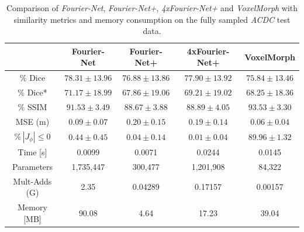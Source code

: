 \documentclass[english,version-2022-01]{uzl-thesis} %
\begin{document}
\begin{table}[h] %
	\centering
	\caption{Comparison of \emph{Fourier-Net}, \emph{Fourier-Net+}, \emph{4xFourier-Net+} and \emph{VoxelMorph} with similarity metrics and memory consumption on the fully sampled \emph{ACDC} test data.}
	\label{tab:CompareVoxelMorph}
	\begin{tabular}{c c c c c} %
		\toprule
		 & Fourier-Net & Fourier-Net+ & 4xFourier-Net+ & VoxelMorph \\		
		\midrule
		$\%$ Dice & $78.31 \pm 13.96$ & $76.88 \pm 13.86$ & $77.90 \pm 13.92$ & $75.84 \pm 13.46$ \\
		$\%$ Dice* & $71.17 \pm 18.99$ & $67.86 \pm 19.06$ & $69.21 \pm 19.02$ & $68.25 \pm 18.36$ \\
		$\%$ SSIM & $91.53 \pm 3.49$ & $88.67 \pm 3.88$ & $88.89 \pm 4.05$ & $93.53 \pm 3.30$ \\
		MSE (m) & $0.09 \pm 0.07$ & $0.20 \pm 0.15$ & $0.19 \pm 0.14$ & $0.06 \pm 0.04$ \\
		$\% \, |J_{\phi}|\leq0$ & $0.44 \pm 0.45$ & $0.04 \pm 0.14$ & $0.01 \pm 0.04$ & $89.96 \pm 1.32$ \\
		Time [s] 	  & 0.0099    & 0.0071 	& 0.0244  	& 0.0145 \\
		Parameters 	  & 1,735,447 & 300,477 	& 1,201,908 	& 84,322 \\
		Mult-Adds (G) & 2.35      & 0.04289  & 0.17157  	& 0.00157 \\
		Memory [MB] 	  & 90.08     & 4.64   	& 17.23    	& 39.04 \\
		\bottomrule
	\end{tabular}		
\end{table}
\end{document}
